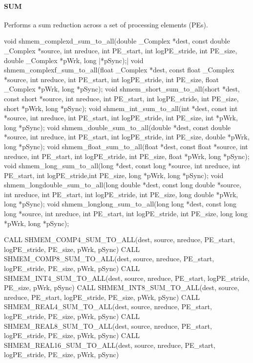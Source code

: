 \begin{apidefinition}
\paragraph{SUM}
Performs a sum reduction across a set of processing elements (\acp{PE}).\newline
\begin{Csynopsis}
void shmem_complexd_sum_to_all(double _Complex *dest, const double _Complex *source, int nreduce, int PE_start, int logPE_stride, int PE_size, double _Complex *pWrk, long |\mbox{*pSync);}|
void shmem_complexf_sum_to_all(float _Complex *dest, const float _Complex *source, int nreduce, int PE_start, int logPE_stride, int PE_size, float _Complex *pWrk, long *pSync);
void shmem_short_sum_to_all(short *dest, const short *source, int nreduce, int PE_start, int logPE_stride, int PE_size, short *pWrk, long *pSync);
void shmem_int_sum_to_all(int *dest, const int *source, int nreduce, int PE_start, int logPE_stride, int PE_size, int *pWrk, long *pSync);
void shmem_double_sum_to_all(double *dest, const double *source, int nreduce, int PE_start, int logPE_stride, int PE_size, double *pWrk, long *pSync);
void shmem_float_sum_to_all(float *dest, const float *source, int nreduce, int PE_start, int logPE_stride, int PE_size, float *pWrk, long *pSync);
void shmem_long_sum_to_all(long *dest, const long *source, int nreduce, int PE_start, int logPE_stride,int PE_size, long *pWrk, long *pSync);
void shmem_longdouble_sum_to_all(long double *dest, const long double *source, int nreduce, int PE_start, int logPE_stride, int PE_size, long double *pWrk, long *pSync);
void shmem_longlong_sum_to_all(long long *dest, const long long *source, int nreduce, int PE_start, int logPE_stride, int PE_size, long long *pWrk, long *pSync);
\end{Csynopsis}

\begin{Fsynopsis}
CALL SHMEM_COMP4_SUM_TO_ALL(dest, source, nreduce, PE_start, logPE_stride, PE_size, pWrk, pSync)
CALL SHMEM_COMP8_SUM_TO_ALL(dest, source, nreduce, PE_start, logPE_stride, PE_size, pWrk, pSync)
CALL SHMEM_INT4_SUM_TO_ALL(dest, source, nreduce, PE_start, logPE_stride, PE_size, pWrk, pSync)
CALL SHMEM_INT8_SUM_TO_ALL(dest, source, nreduce, PE_start, logPE_stride, PE_size, pWrk, pSync)
CALL SHMEM_REAL4_SUM_TO_ALL(dest, source, nreduce, PE_start, logPE_stride, PE_size, pWrk, pSync)
CALL SHMEM_REAL8_SUM_TO_ALL(dest, source, nreduce, PE_start, logPE_stride, PE_size, pWrk, pSync)
CALL SHMEM_REAL16_SUM_TO_ALL(dest, source, nreduce, PE_start, logPE_stride, PE_size, pWrk, pSync)
\end{Fsynopsis}


\end{apidefinition}
